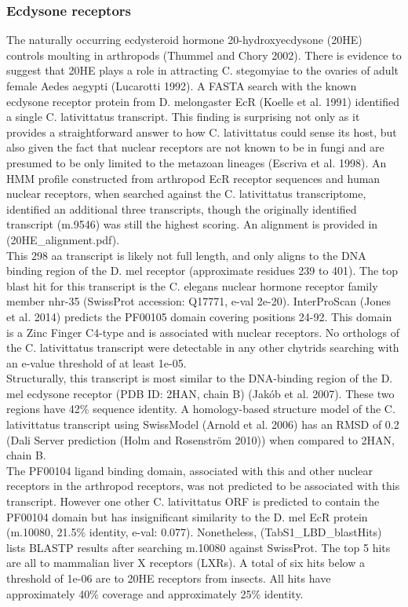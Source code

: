 \subsubsection*{Ecdysone receptors}
The naturally occurring ecdysteroid hormone 20-hydroxyecdysone (20HE) controls moulting in arthropods (Thummel and Chory 2002). There is evidence to suggest that 20HE plays a role in attracting C. stegomyiae to the ovaries of adult female Aedes aegypti (Lucarotti 1992). A FASTA search with the known ecdysone receptor protein from D. melongaster EcR (Koelle et al. 1991) identified a single C. lativittatus transcript. This finding is surprising not only as it provides a straightforward answer to how C. lativittatus could sense its host, but also given the fact that nuclear receptors are not known to be in fungi and are presumed to be only limited to the metazoan lineages (Escriva et al. 1998). An HMM profile constructed from arthropod EcR receptor sequences and human nuclear receptors, when searched against the C. lativittatus transcriptome, identified an additional three transcripts, though the originally identified transcript (m.9546) was still the highest scoring. An alignment is provided in (20HE\_alignment.pdf).\\
\indent This 298 aa transcript is likely not full length, and only aligns to the DNA binding region of the D. mel receptor (approximate residues 239 to 401). The top blast hit for this transcript is the C. elegans nuclear hormone receptor family member nhr-35 (SwissProt accession: Q17771, e-val 2e-20). InterProScan (Jones et al. 2014) predicts the PF00105 domain covering positions 24-92. This domain is a Zinc Finger C4-type and is associated with nuclear receptors. No orthologs of the C. lativittatus transcript were detectable in any other chytrids searching with an e-value threshold of at least 1e-05. \\
\indent Structurally, this transcript is most similar to the DNA-binding region of the D. mel ecdysone receptor (PDB ID: 2HAN, chain B) (Jakób et al. 2007). These two regions have 42\% sequence identity. A homology-based structure model of the C. lativittatus transcript using SwissModel (Arnold et al. 2006) has an RMSD of 0.2 (Dali Server prediction (Holm and Rosenström 2010)) when compared to 2HAN, chain B. \\
\indent The PF00104 ligand binding domain, associated with this and other nuclear receptors in the arthropod receptors, was not predicted to be associated with this transcript. However one other C. lativittatus ORF is predicted to contain the PF00104 domain but has insignificant similarity to the D. mel EcR protein (m.10080, 21.5\% identity, e-val: 0.077). Nonetheless, (TabS1\_LBD\_blastHits) lists BLASTP results after searching m.10080 against SwissProt. The top 5 hits are all to mammalian liver X receptors (LXRs). A total of six hits below a threshold of 1e-06 are to 20HE receptors from insects. All hits have approximately 40\% coverage and approximately 25\% identity. \\

